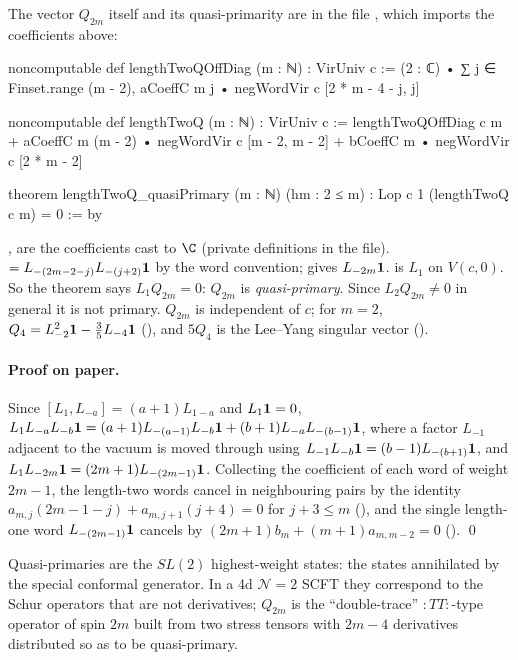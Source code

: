 \noindent The vector $Q_{2m}$ itself and its quasi-primarity are in the file
, which imports the
coefficients above:
\begin{leancode}
noncomputable def lengthTwoQOffDiag (m : ℕ) : VirUniv c :=
  (2 : ℂ) • ∑ j ∈ Finset.range (m - 2),
    aCoeffC m j • negWordVir c [2 * m - 4 - j, j]

noncomputable def lengthTwoQ (m : ℕ) : VirUniv c :=
  lengthTwoQOffDiag c m
    + aCoeffC m (m - 2) • negWordVir c [m - 2, m - 2]
    + bCoeffC m • negWordVir c [2 * m - 2]

theorem lengthTwoQ_quasiPrimary (m : ℕ) (hm : 2 ≤ m) :
    Lop c 1 (lengthTwoQ c m) = 0 := by
\end{leancode}

\begin{dictionary}
,  are the coefficients cast to $\C$ (private definitions in the file).
 $= L_{-(2m-2-j)}L_{-(j+2)}\mathbf{1}$ by the word convention;
\lean{[2*m-2]} gives $L_{-2m}\mathbf{1}$.  is $L_1$ on $V(c,0)$. So the theorem says
$L_1Q_{2m} = 0$: $Q_{2m}$ is \emph{quasi-primary}. Since $L_2Q_{2m}\ne0$ in general it is not primary.
$Q_{2m}$ is independent of $c$; for $m=2$, $Q_4 = L_{-2}^2\mathbf{1}-\tfrac35L_{-4}\mathbf{1}$
(), and $5Q_4$ is the Lee--Yang singular vector ().
\end{dictionary}

\paragraph{Proof on paper.} Since $[L_1,L_{-a}] = (a+1)L_{1-a}$ and $L_1\mathbf{1} = 0$,
$L_1L_{-a}L_{-b}\mathbf{1} = (a+1)L_{-(a-1)}L_{-b}\mathbf{1} + (b+1)L_{-a}L_{-(b-1)}\mathbf{1}$, where a factor
$L_{-1}$ adjacent to the vacuum is moved through using $L_{-1}L_{-b}\mathbf{1} = (b-1)L_{-(b+1)}\mathbf{1}$, and
$L_1L_{-2m}\mathbf{1} = (2m+1)L_{-(2m-1)}\mathbf{1}$. Collecting the coefficient of each word of weight $2m-1$,
the length-two words cancel in neighbouring pairs by the identity
$a_{m,j}(2m-1-j) + a_{m,j+1}(j+4) = 0$ for $j+3\le m$ (), and the single
length-one word $L_{-(2m-1)}\mathbf{1}$ cancels by $(2m+1)b_m + (m+1)a_{m,m-2} = 0$
(). \qed

\begin{physics}
Quasi-primaries are the $SL(2)$ highest-weight states: the states annihilated by the special conformal
generator. In a 4d $\mathcal N=2$ SCFT they correspond to the Schur operators that are not derivatives;
$Q_{2m}$ is the ``double-trace'' $:TT:$-type operator of spin $2m$ built from two stress tensors with
$2m-4$ derivatives distributed so as to be quasi-primary.
\end{physics}

